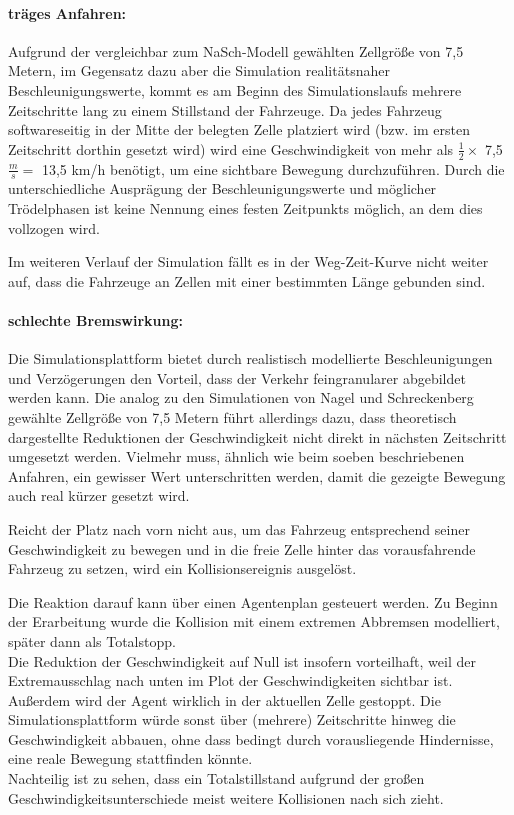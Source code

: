 \paragraph{träges Anfahren:}
\label{sec:accelerategroove}

Aufgrund der vergleichbar zum NaSch-Modell gewählten Zellgröße von 7,5 Metern, im Gegensatz dazu aber die Simulation realitätsnaher Beschleunigungswerte, kommt es am Beginn des Simulationslaufs mehrere Zeitschritte lang zu einem Stillstand der Fahrzeuge.
Da jedes Fahrzeug softwareseitig in der Mitte der belegten Zelle platziert wird (bzw. im ersten Zeitschritt dorthin gesetzt wird) wird eine Geschwindigkeit von mehr als $ \frac{1}{2} \times $ 7,5 $ \frac{m}{s} = $ 13,5 km/h benötigt, um eine sichtbare Bewegung durchzuführen.
Durch die unterschiedliche Ausprägung der Beschleunigungswerte und möglicher Trödelphasen ist keine Nennung eines festen Zeitpunkts möglich, an dem dies vollzogen wird.

Im weiteren Verlauf der Simulation fällt es in der Weg-Zeit-Kurve nicht weiter auf, dass die Fahrzeuge an Zellen mit einer bestimmten Länge gebunden sind.



\paragraph{schlechte Bremswirkung:}
\label{sec:bremsverhalten}

Die Simulationsplattform bietet durch realistisch modellierte Beschleunigungen und Verzögerungen den Vorteil, dass der Verkehr feingranularer abgebildet werden kann.
Die analog zu den Simulationen von Nagel und Schreckenberg gewählte Zellgröße von 7,5 Metern führt allerdings dazu, dass theoretisch dargestellte Reduktionen der Geschwindigkeit nicht direkt in nächsten Zeitschritt umgesetzt werden.
Vielmehr muss, ähnlich wie beim soeben beschriebenen Anfahren, ein gewisser Wert unterschritten werden, damit die gezeigte Bewegung auch real kürzer gesetzt wird.

Reicht der Platz nach vorn nicht aus, um das Fahrzeug entsprechend seiner Geschwindigkeit zu bewegen und in die freie Zelle hinter das vorausfahrende Fahrzeug zu setzen, wird ein Kollisionsereignis ausgelöst.

Die Reaktion darauf kann über einen Agentenplan gesteuert werden.
Zu Beginn der Erarbeitung wurde die Kollision mit einem extremen Abbremsen modelliert, später dann als Totalstopp.
\\
Die Reduktion der Geschwindigkeit auf Null ist insofern vorteilhaft, weil der Extremausschlag nach unten im Plot der Geschwindigkeiten sichtbar ist.
Außerdem wird der Agent wirklich in der aktuellen Zelle gestoppt. 
Die Simulationsplattform würde sonst über (mehrere) Zeitschritte hinweg die Geschwindigkeit abbauen, ohne dass bedingt durch vorausliegende Hindernisse, eine reale Bewegung stattfinden könnte. 
\\
Nachteilig ist zu sehen, dass ein Totalstillstand aufgrund der großen Geschwindigkeitsunterschiede meist weitere Kollisionen nach sich zieht.

